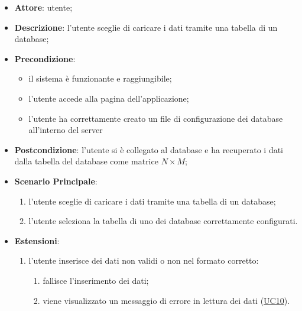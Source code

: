     \begin{itemize}
    \item \textbf{Attore}: utente;
    \item \textbf{Descrizione}: l'utente sceglie di caricare i dati tramite una tabella di un database;
    \item \textbf{Precondizione}:
    \begin{itemize}
        \item il sistema è funzionante e raggiungibile;
        \item l'utente accede alla pagina dell'applicazione;
        \item l'utente ha correttamente creato un file di configurazione dei database all'interno del server
    \end{itemize}
    \item \textbf{Postcondizione}: l'utente si è collegato al database e ha recuperato i dati dalla tabella del database come matrice $N\times M$;
    \item \textbf{Scenario Principale}: 
        \begin{enumerate}
            \item l'utente sceglie di caricare i dati tramite una tabella di un database;
            \item l'utente seleziona la tabella di uno dei database correttamente configurati.
        \end{enumerate}
        \item \textbf{Estensioni}:
        \begin{enumerate}
            \item l'utente inserisce dei dati non validi o non nel formato corretto:
                \begin{enumerate}
                    \item fallisce l'inserimento dei dati;
                    \item viene visualizzato un messaggio di errore in lettura dei dati (\hyperref[uc10]{UC10}).
                \end{enumerate}
        \end{enumerate}  
    \end{itemize}

    